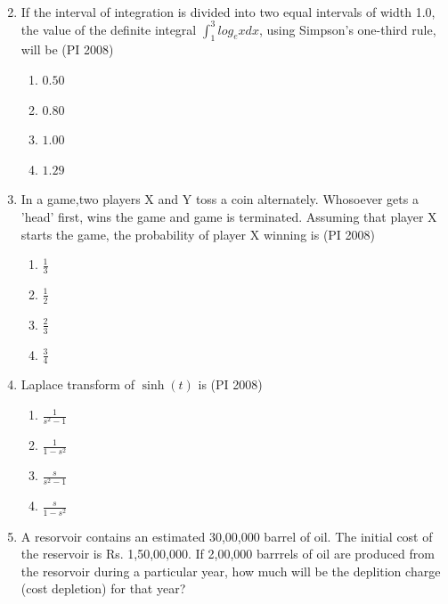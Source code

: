 \documentclass[journal,12pt,onecolumn]{IEEEtran}
\theoremstyle{remark}
\begin{document}
\begin{enumerate}
\[\begin{matrix}
    \end{matrix}\]
    \vspace{1cm}
    \item %
    If the interval of integration is divided into two equal intervals of width 1.0, the value of the definite integral $\int_1^3 log_e x dx$, using Simpson's one-third rule, will be
    \hfill{(PI 2008)}
    \begin{multicols}{4}
    \begin{enumerate}
        \item $0.50$
        \item $0.80$
        \item $1.00$
        \item $1.29$
    \end{enumerate}
\end{multicols}
\item %
In a game,two players X and Y toss a coin alternately. Whosoever gets a 'head' first, wins the game and game is terminated. Assuming  that player X starts the game, the probability of player X winning is 
    \hfill{(PI 2008)}
    \begin{multicols}{4}
    \begin{enumerate}
        \item $\frac{1}{3}$
        \item $\frac{1}{2}$
        \item $\frac{2}{3}$
        \item $\frac{3}{4}$
    \end{enumerate}
\end{multicols}
\item %
Laplace transform of $\sinh (t)$ is  
    \hfill{(PI 2008)}
    \begin{multicols}{4}
    \begin{enumerate}
        \item $\frac{1}{s^2 -1}$
        \item $\frac{1}{1-s^2}$
        \item $\frac{s}{s^2-1}$
        \item $\frac{s}{1-s^2}$
    \end{enumerate}
\end{multicols}
\item %
A resorvoir contains an estimated 30,00,000 barrel of oil. The initial cost of the reservoir is Rs. 1,50,00,000. If 2,00,000 barrrels of oil are produced from the resorvoir during a particular year, how much will be the deplition charge (cost depletion) for that year?  

\end{enumerate}
\end{document}
